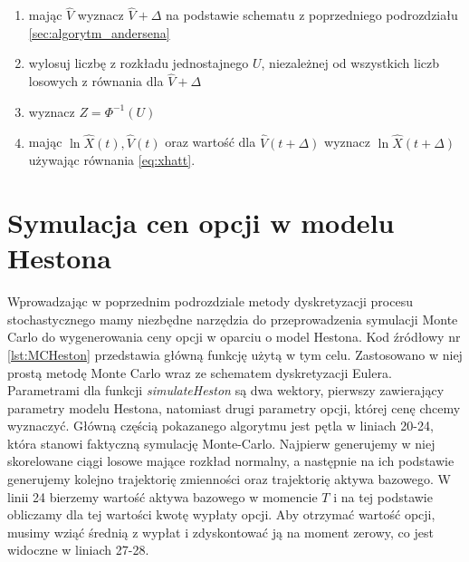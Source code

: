 \documentclass{pracamgr}
\begin{document}
{\begin{enumerate}
  \item mając $\hat{V}$ wyznacz $\hat{V} + \Delta$ na podstawie schematu z poprzedniego podrozdziału \ref{sec:algorytm_andersena}
  \item wylosuj liczbę z rozkładu jednostajnego $U$, niezależnej od wszystkich liczb losowych z równania dla $\hat{V} + \Delta$
  \item wyznacz $Z = \Phi^{-1}(U)$
  \item mając $\ln \hat{X}(t), \hat{V}(t)$ oraz wartość dla $\hat{V}(t + \Delta)$ wyznacz $\ln \hat{X} (t+\Delta)$ używając równania \ref{eq:xhatt}.
\end{enumerate}





\section{Symulacja cen opcji w modelu Hestona}

Wprowadzając w poprzednim podrozdziale metody dyskretyzacji procesu stochastycznego mamy niezbędne narzędzia
do przeprowadzenia symulacji Monte Carlo do wygenerowania ceny opcji w oparciu o model Hestona.
Kod źródłowy nr \ref{lst:MCHeston} przedstawia główną funkcję użytą w tym celu. 
Zastosowano w niej prostą metodę Monte Carlo wraz ze schematem dyskretyzacji Eulera. 
Parametrami dla funkcji \textit{simulateHeston} są dwa wektory, pierwszy zawierający
parametry modelu Hestona, natomiast drugi parametry opcji, której cenę chcemy wyznaczyć. 
Główną częścią pokazanego algorytmu jest pętla w liniach 20-24, która stanowi faktyczną symulację
Monte-Carlo. Najpierw generujemy w niej skorelowane ciągi losowe mające rozkład normalny, a następnie na ich
podstawie generujemy kolejno trajektorię zmienności oraz trajektorię aktywa bazowego. W linii 24 bierzemy 
wartość aktywa bazowego w momencie $T$ i na tej podstawie obliczamy dla tej wartości kwotę wypłaty opcji. 
Aby otrzymać wartość opcji, musimy wziąć średnią z wypłat i zdyskontować ją na moment zerowy, co jest 
widoczne w liniach 27-28.














}
\end{document}
